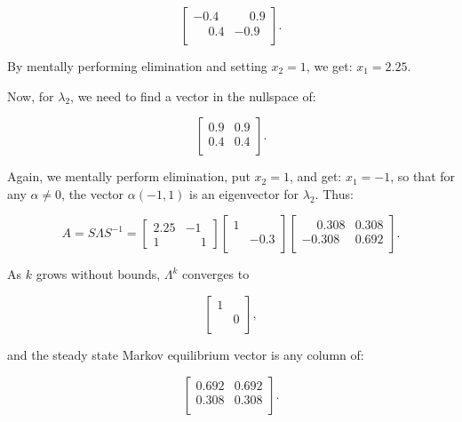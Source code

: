 \documentclass{article}
\begin{document}
\[
\begin{bmatrix}
-0.4 & \phantom{-}0.9\\
\phantom{-}0.4 & -0.9\\
\end{bmatrix}.
\]

By mentally performing elimination and setting $x_2 = 1$, we get: $x_1 = 2.25$.

Now, for $\lambda_2$, we need to find a vector in the nullspace of:

\[
\begin{bmatrix}
0.9 & 0.9\\
0.4 & 0.4\\
\end{bmatrix}.
\]

Again, we mentally perform elimination, put $x_2 = 1$, and get: $x_1 = -1$, so that for any $\alpha \neq 0$, the vector $\alpha(-1, 1)$ is an eigenvector for $\lambda_2$. Thus:

\[
A = S\Lambda S^{-1} = \begin{bmatrix}
2.25 & -1\\
1 & \phantom{-}1
\end{bmatrix}
\begin{bmatrix}
1 & \\
  & -0.3\\
\end{bmatrix}
\begin{bmatrix}
\phantom{-}0.308 & 0.308\\
-0.308 & 0.692\\
\end{bmatrix}.
\]

As $k$ grows without bounds, $\Lambda^{k}$ converges to

\[
\begin{bmatrix}
1 & \\
  & 0\\
\end{bmatrix},
\]

and the steady state Markov equilibrium vector is any column of:

\[
\begin{bmatrix}
0.692 & 0.692\\
0.308 & 0.308\\
\end{bmatrix}.
\]
\end{document}
